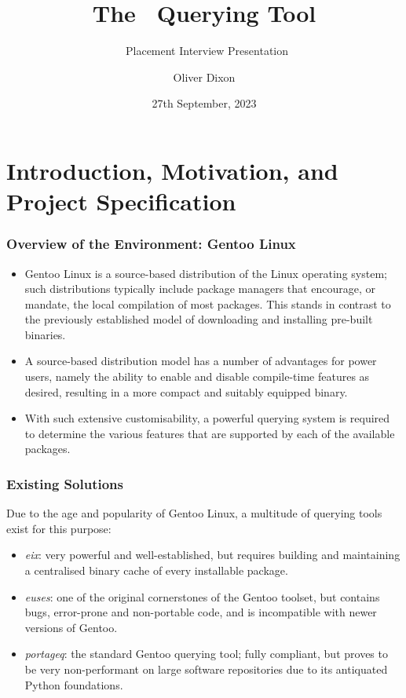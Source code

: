 \documentclass{beamer}
\date{27th September, 2023} %
\title[Placement Interview Presentation]{The \programname\ Querying Tool}
\author[Oliver Dixon]{
    \texorpdfstring{Oliver Dixon \raisebox{.5pt}{%
        \texttt{\footnotesize\href{mailto:Oliver Dixon <od641@york.ac.uk>}
            {<od641@york.ac.uk>}}
    }}{Oliver Dixon}}
\institute[University of York]{Department of Computer Science, University of
    York \and Department of Mathematics, University of York}
\subtitle{\companyname\ Placement Interview Presentation}
\numberwithin{figure}{section}
\begin{document}
\frame{\titlepage}
\section{Introduction, Motivation, and Project Specification}
\begin{frame}
    \frametitle{Overview of the Environment: Gentoo Linux}
    \begin{itemize}
        \item Gentoo Linux is a source-based distribution of the Linux operating
            system; such distributions typically include package managers that
            encourage, or mandate, the local compilation of most packages. This
            stands in contrast to the previously established model of
            downloading and installing pre-built binaries.
        \item A source-based distribution model has a number of advantages for
            power users, namely the ability to enable and disable compile-time
            features as desired, resulting in a more compact and suitably
            equipped binary.
        \item With such extensive customisability, a powerful querying system is
            required to determine the various features that are supported by
            each of the available packages.
    \end{itemize}
\end{frame}
\begin{frame}
    \frametitle{Existing Solutions}
    Due to the age and popularity of Gentoo Linux, a multitude of querying tools
    exist for this purpose:
    \pause

    \begin{itemize}
        \item \emph{eix}: very powerful and well-established, but requires
            building and maintaining a centralised binary cache of every
            installable package.
        \item \emph{euses}: one of the original cornerstones of the Gentoo
            toolset, but contains bugs, error-prone and non-portable code, and
            is incompatible with newer versions of Gentoo.
        \item \emph{portageq}: the standard Gentoo querying tool; fully
            compliant, but proves to be very non-performant on large software
            repositories due to its antiquated Python foundations.
    \end{itemize}
\end{frame}
\end{document}
